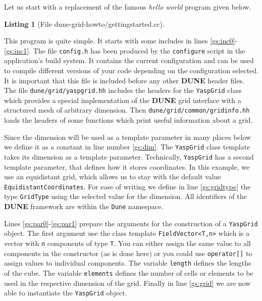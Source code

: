 \documentclass[11pt,a4paper,headinclude,footinclude,DIV16,headings=normal]{scrreprt}
\newcommand{\Dune}{{\sffamily\bfseries DUNE}\xspace}
\newtheorem{lst}{Listing}
\begin{document}
Let us start with a replacement of the famous \emph{hello world}
program given below.

\begin{lst}[File dune-grid-howto/gettingstarted.cc] \mbox{}

\end{lst}

This program is quite simple. It starts with some includes in lines
\ref{gs:inc0}-\ref{gs:inc1}. The file \lstinline!config.h! has been
produced by the \lstinline!configure! script in the application's
build system. It contains the current configuration and can be used to
compile different versions of your code depending on the configuration
selected. It is important that this file is included before any other
\Dune{} header files. The file \lstinline!dune/grid/yaspgrid.hh!
includes the headers for the \lstinline!YaspGrid! class which provides a
special implementation of the \Dune{} grid interface with a
structured mesh of arbitrary dimension. Then
\lstinline!dune/grid/common/gridinfo.hh!  loads the headers of some
functions which print useful information about a grid.

Since the dimension will be used as a template parameter in many
places below we define it as a constant in line number \ref{gs:dim}.
The \lstinline!YaspGrid! class template takes its dimension as a
template parameter.  Technically, \lstinline!YaspGrid! has a second template
parameter, that defines how it stores coordinates. In this example, we
use an equidistant grid, which allows us to stay with the default value
\lstinline!EquidistantCoordinates!. For ease of writing we
define in line \ref{gs:gridtype} the type \lstinline!GridType! using
the selected value for the dimension. All identifiers of the \Dune{}
framework are within the \lstinline!Dune! namespace.

Lines \ref{gs:par0}-\ref{gs:par1} prepare the arguments for the
construction of a \lstinline!YaspGrid! object. The first argument use
the class template \lstinline!FieldVector<T,n>! which is a vector with
\lstinline!n!  components of type \lstinline!T!. You can either assign
the same value to all components in the constructor (as is done here)
or you could use \lstinline!operator[]! to assign values to individual
components. The variable \lstinline!length! defines the lengths of
the cube. The variable \lstinline!elements! defines the number of
cells or elements to be used in the respective dimension of the grid.
Finally in line \ref{gs:grid} we are now able to
instantiate the \lstinline!YaspGrid!  object.
\end{document}
